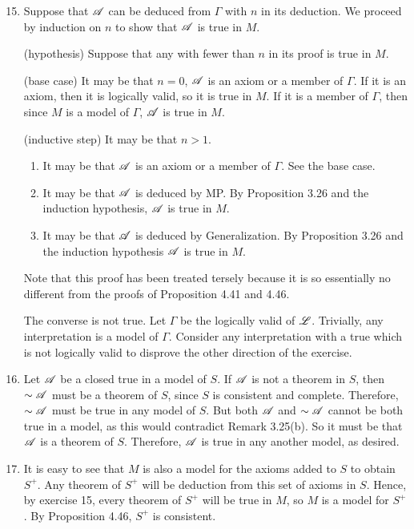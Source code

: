\solutions{}
\begin{enumerate}
  \setcounter{enumi}{14}
  \item %
    Suppose that \(\mathscr{A}\) can be deduced from \(\Gamma\) with \(n\) \wfs{} in its deduction. We proceed by induction on \(n\) to show that \(\mathscr{A}\) is true in \(M\).

    (hypothesis) Suppose that any \wf{} with fewer than \(n\) \wfs{} in its proof is true in \(M\).

    (base case) It may be that \(n=0\), \(\mathscr{A}\) is an axiom or a member of \(\Gamma\). If it is an axiom, then it is logically valid, so it is true in \(M\). If it is a member of \(\Gamma\), then since \(M\) is a model of \(\Gamma\), \(\mathscr{A}\) is true in \(M\).

    (inductive step) It may be that \(n>1\).
    \begin{enumerate}
      \item It may be that \(\mathscr{A}\) is an axiom or a member of \(\Gamma\). See the base case.
      \item It may be that \(\mathscr{A}\) is deduced by MP. By Proposition 3.26 and the induction hypothesis, \(\mathscr{A}\) is true in \(M\).
      \item It may be that \(\mathscr{A}\) is deduced by Generalization. By Proposition 3.26 and the induction hypothesis \(\mathscr{A}\) is true in \(M\).
    \end{enumerate}
    Note that this proof has been treated tersely because it is so essentially no different from the proofs of Proposition 4.41 and 4.46.

    The converse is not true. Let \(\Gamma\) be the logically valid \wfs{} of \(\mathscr{L}\). Trivially, any interpretation is a model of \(\Gamma\). Consider any interpretation with a true \wf{} which is not logically valid to disprove the other direction of the exercise.

  \item %
    Let \(\mathscr{A}\) be a closed \wf{} true in a model of \(S\). If \(\mathscr{A}\) is not a theorem in \(S\), then \(\sim\mathscr{A}\) must be a theorem of \(S\), since \(S\) is consistent and complete. Therefore, \(\sim\mathscr{A}\) must be true in any model of \(S\). But both \(\mathscr{A}\) and \(\sim\mathscr{A}\) cannot be both true in a model, as this would contradict Remark 3.25(b). So it must be that \(\mathscr{A}\) is a theorem of \(S\). Therefore, \(\mathscr{A}\) is true in any another model, as desired.

  \item %
    It is easy to see that \(M\) is also a model for the axioms added to \(S\) to obtain \(S^+\). Any theorem of \(S^+\) will be deduction from this set of axioms in \(S\). Hence, by exercise 15, every theorem of \(S^+\) will be true in \(M\), so \(M\) is a model for \(S^+\). By Proposition 4.46, \(S^+\) is consistent.


\end{enumerate}
